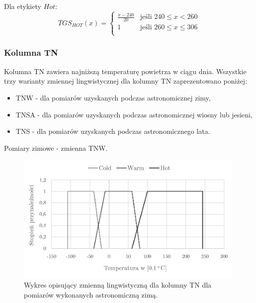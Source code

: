 \documentclass{classrep}
\begin{document}
Dla etykiety $Hot$:
\begin{equation}
{TGS}_{HOT}(x)= \left\{ \begin{array}{ll}
\frac{x-240}{20} & \textrm{jeśli $240 \leq x < 260$} \\
1 			 & \textrm{jeśli $260 \leq x \leq 306$} \\
\end{array} \right.
\end{equation}


\clearpage






\subsubsection{Kolumna TN}
Kolumna TN zawiera najniższą temperaturę powietrza w ciągu dnia. Wszystkie trzy warianty zmiennej lingwistycznej dla kolumny TN zaprezentowano poniżej:

\begin{itemize}[label=$\bullet$\scshape\bfseries]
\item TNW - dla pomiarów uzyskanych podczas astronomicznej zimy,
\item TNSA - dla pomiarów uzyskanych podczas astronomicznej wiosny lub jesieni,
\item TNS - dla pomiarów uzyskanych podczas astronomicznego lata.\newline\newline\newline
\end{itemize}


Pomiary zimowe - zmienna TNW.
\begin{figure}[H]
	\centering
	\includegraphics[width=0.99\textwidth]{Pictures/TermsCharts/TN_Z.png}
	\caption{Wykres opisujący zmienną lingwistyczną dla kolumny TN dla pomiarów wykonanych astronomiczną zimą.}
\end{figure}
\end{document}
